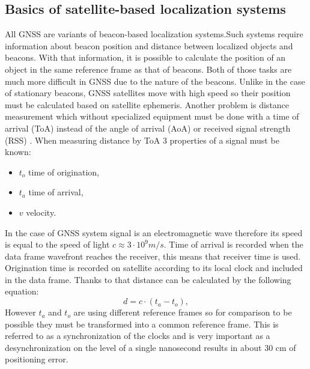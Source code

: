 \documentclass{article}
\begin{document}
\subsection{Basics of satellite-based localization systems}
All GNSS are variants of beacon-based localization
systems\cite{Blewitt1997}.Such systems require information about beacon position
and distance between localized objects and beacons.
With that information, it is possible to calculate the position of an object in the same reference
frame as that of beacons.
Both of those tasks are much more difficult in GNSS due to the nature of the beacons.
Unlike in the case of stationary beacons, GNSS satellites move with high speed so
their position must be calculated based on satellite ephemeris\cite{Vallado2008}.
Another problem is distance measurement which without specialized equipment must be
done with a time of arrival (ToA) instead of the angle of arrival (AoA) or
received signal strength (RSS) \cite{Doberstein2012}.
When measuring distance by ToA  3 properties of a signal must be known:
\begin{itemize}
\item $t_o$ time of origination,
\item $t_a$ time of arrival,
\item $v$ velocity.
\end{itemize}
In the case of GNSS system signal is an electromagnetic wave therefore its speed is equal
to the speed of light $c\approx 3 \cdot 10^{9} m/s$. Time of arrival is recorded when
the data frame wavefront reaches the receiver, this means that receiver time is used.
Origination time is recorded on satellite according to its local clock and
included in the data frame. Thanks to that distance can be calculated by the following 
equation:
\begin{equation}
  d=c\cdot (t_a-t_o),
\end{equation}
However $t_a$ and $t_o$ are using different reference frames so for comparison
to be possible they must be transformed into a common reference frame.
This is referred to as a synchronization of the clocks and is very important as
a desynchronization on the level of a single nanosecond results in about 30 cm of
positioning error\cite{Enge2011}.

\end{document}
